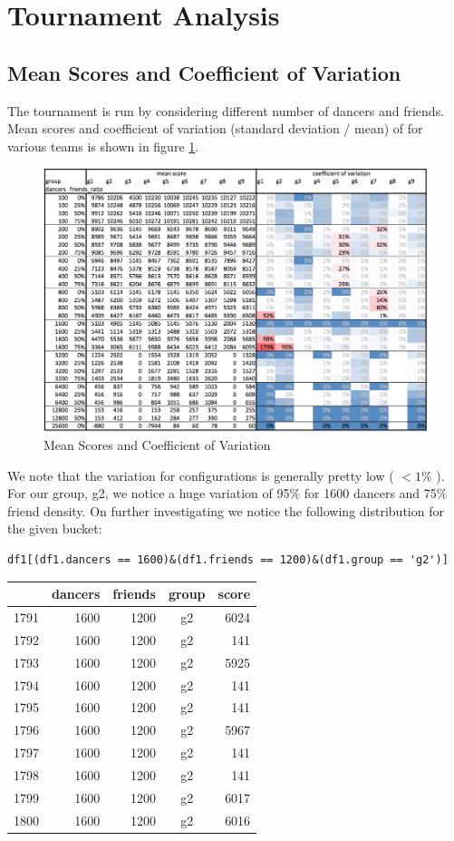 \section{Tournament Analysis}\label{tournament-analysis}

\subsection{Mean Scores and Coefficient of
Variation}\label{mean-scores-and-coefficient-of-variation}

The tournament is run by considering different number of dancers and
friends. Mean scores and coefficient of variation (standard deviation /
mean) of for various teams is shown in figure \ref{img-mean-cov}.

\begin{figure}[htbp]
\centering
\includegraphics[width=\textwidth]{imgs/mean-cov.png}
\caption{Mean Scores and Coefficient of Variation\label{img-mean-cov}}
\end{figure}

We note that the variation for configurations is generally pretty low (
\(< 1\%\) ). For our group, g2, we notice a huge variation of 95\% for
1600 dancers and 75\% friend density. On further investigating we notice
the following distribution for the given bucket:

\begin{verbatim}
df1[(df1.dancers == 1600)&(df1.friends == 1200)&(df1.group == 'g2')]
\end{verbatim}

\begin{longtable}[c]{@{}lrrcr@{}}
\toprule
& dancers & friends & group & score\tabularnewline
\midrule
\endhead
1791 & 1600 & 1200 & g2 & 6024\tabularnewline
1792 & 1600 & 1200 & g2 & 141\tabularnewline
1793 & 1600 & 1200 & g2 & 5925\tabularnewline
1794 & 1600 & 1200 & g2 & 141\tabularnewline
1795 & 1600 & 1200 & g2 & 141\tabularnewline
1796 & 1600 & 1200 & g2 & 5967\tabularnewline
1797 & 1600 & 1200 & g2 & 141\tabularnewline
1798 & 1600 & 1200 & g2 & 141\tabularnewline
1799 & 1600 & 1200 & g2 & 6017\tabularnewline
1800 & 1600 & 1200 & g2 & 6016\tabularnewline
\bottomrule
\end{longtable}

